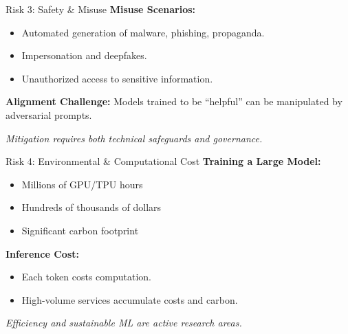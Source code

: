 \documentclass[aspectratio=169,10pt]{beamer}
\begin{document}
\begin{frame}{Risk 3: Safety \& Misuse}
  \textbf{Misuse Scenarios:}
  \begin{itemize}
    \item Automated generation of malware, phishing, propaganda.
    \item Impersonation and deepfakes.
    \item Unauthorized access to sensitive information.
  \end{itemize}

  \vspace{0.3cm}

  \textbf{Alignment Challenge:}
  Models trained to be ``helpful'' can be manipulated by adversarial prompts.

  \vspace{0.3cm}

  \textit{Mitigation requires both technical safeguards and governance.}
\end{frame}

\begin{frame}{Risk 4: Environmental \& Computational Cost}
  \textbf{Training a Large Model:}
  \begin{itemize}
    \item Millions of GPU/TPU hours
    \item Hundreds of thousands of dollars
    \item Significant carbon footprint
  \end{itemize}

  \vspace{0.3cm}

  \textbf{Inference Cost:}
  \begin{itemize}
    \item Each token costs computation.
    \item High-volume services accumulate costs and carbon.
  \end{itemize}

  \vspace{0.3cm}

  \textit{Efficiency and sustainable ML are active research areas.}
\end{frame}
\end{document}
